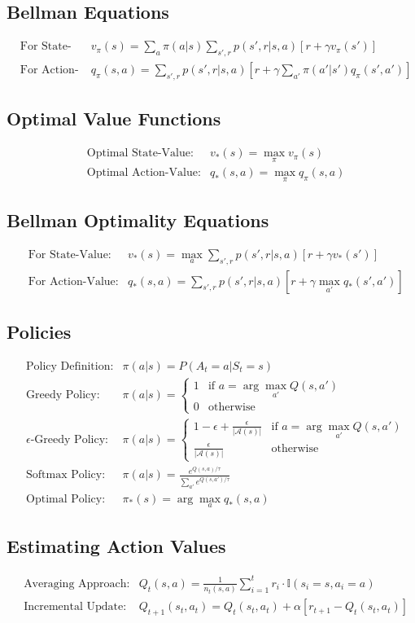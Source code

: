 \documentclass[12pt,a4paper]{article}
\begin{document}
\subsection{Bellman Equations}
\begin{align}
&\text{For State-Value:} & v_{\pi}(s) = \sum_{a} \pi(a|s) \sum_{s',r} p(s',r|s,a) [r + \gamma v_{\pi}(s')] \\
&\text{For Action-Value:} & q_{\pi}(s,a) = \sum_{s',r} p(s',r|s,a) \left[r + \gamma \sum_{a'} \pi(a'|s') q_{\pi}(s',a') \right]
\end{align}

\subsection{Optimal Value Functions}
\begin{align}
&\text{Optimal State-Value:} & v_*(s) = \max_{\pi} v_{\pi}(s) \\
&\text{Optimal Action-Value:} & q_*(s,a) = \max_{\pi} q_{\pi}(s,a)
\end{align}

\subsection{Bellman Optimality Equations}
\begin{align}
&\text{For State-Value:} & v_*(s) = \max_a \sum_{s',r} p(s',r|s,a) [r + \gamma v_*(s')] \\
&\text{For Action-Value:} & q_*(s,a) = \sum_{s',r} p(s',r|s,a) [r + \gamma \max_{a'} q_*(s',a')]
\end{align}

\subsection{Policies}
\begin{align}
&\text{Policy Definition:} & \pi(a|s) = P(A_t = a | S_t = s) \\
&\text{Greedy Policy:} & \pi(a|s) = 
\begin{cases}
1 & \text{if } a = \arg\max_{a'} Q(s,a') \\
0 & \text{otherwise}
\end{cases} \\
&\text{$\epsilon$-Greedy Policy:} & \pi(a|s) = 
\begin{cases}
1 - \epsilon + \frac{\epsilon}{|\mathcal{A}(s)|} & \text{if } a = \arg\max_{a'} Q(s,a') \\
\frac{\epsilon}{|\mathcal{A}(s)|} & \text{otherwise}
\end{cases} \\
&\text{Softmax Policy:} & \pi(a|s) = \frac{e^{Q(s,a)/\tau}}{\sum_{a'} e^{Q(s,a')/\tau}} \\
&\text{Optimal Policy:} & \pi_*(s) = \arg\max_a q_*(s,a)
\end{align}

\subsection{Estimating Action Values}
\begin{align}
&\text{Averaging Approach:} & Q_t(s,a) = \frac{1}{n_t(s,a)} \sum_{i=1}^{t} r_i \cdot \mathbb{I}(s_i = s, a_i = a) \\
&\text{Incremental Update:} & Q_{t+1}(s_t,a_t) = Q_t(s_t,a_t) + \alpha [r_{t+1} - Q_t(s_t,a_t)]
\end{align}
\end{document}
